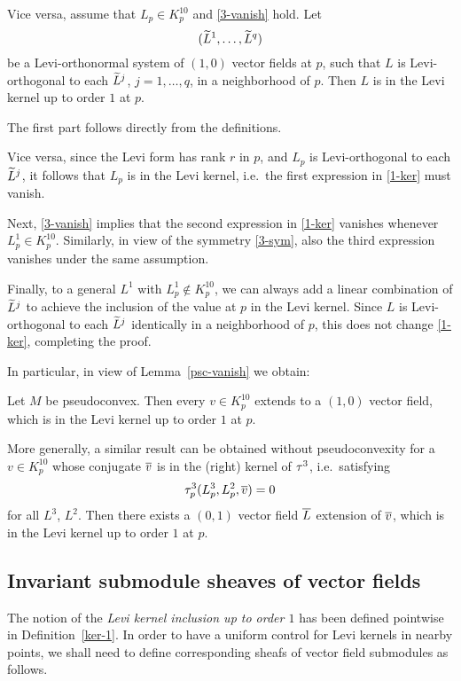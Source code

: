 \documentclass[12pt]{amsart}
\begin{document}
Vice versa, assume that $L_p\in K^{10}_p$ and 
\eqref{3-vanish} hold.
Let
$$(\widetilde{L}^1, \ldots, \widetilde{L}^q)$$
be a Levi-orthonormal system of 
$(1,0)$ vector fields at $p$,
such that $L$ is Levi-orthogonal to each $\widetilde{L}^j$, $j=1,\ldots,q$,
in a neighborhood of $p$.
Then $L$ is in the Levi kernel up to order $1$ at $p$.
\el


\bpf
The first part follows directly from the definitions.

Vice versa, since the Levi form has rank $r$ in $p$,
and $L_p$ is Levi-orthogonal to each $\widetilde{L}^j$,
it follows that $L_p$ is in the Levi kernel, i.e.\
the first expression in \eqref{1-ker} must vanish.

Next, \eqref{3-vanish}
implies that the second expression in \eqref{1-ker}
vanishes whenever $L^1_p\in K^{10}_p$.
Similarly, in view of the symmetry \eqref{3-sym},
also the third expression vanishes
under the same assumption.

Finally, to a general $L^1$ with $L^1_p\notin K^{10}_p$,
we can always add a linear combination of $\widetilde{L}^j$
to achieve the inclusion of the value at $p$ in the Levi kernel.
Since $L$ is Levi-orthogonal to each $\widetilde{L}^j$ identically in a neighborhood of $p$,
this does not change \eqref{1-ker},
completing the proof.
\epf

In particular, in view of Lemma~\ref{psc-vanish} we obtain:

\bc{}
Let $M$ be pseudoconvex.
Then every $v\in K^{10}_p$
extends to a $(1,0)$ vector field,
which is in the Levi kernel up to order $1$ at $p$.
\ec

\br
More generally, a similar result
can be obtained without pseudoconvexity
for a $v\in K^{10}_p$ 
whose conjugate $\overline{v}$ is in the (right) kernel of $\tau^3$, 
i.e.\ satisfying 
$$
	\tau^3_p(L^3_p, L^2_p, \overline{v}) = 0
$$
for all $L^3$, $L^2$.
Then there exists a $(0,1)$ vector field $\overline{L}$ extension of  $\overline{v}$,
which is in the Levi kernel up to order $1$ at $p$.
\er



\subsection{Invariant submodule sheaves of vector fields}
The notion of the {\em Levi kernel inclusion up to order $1$} 
has been defined pointwise in Definition~\ref{ker-1}.
In order to have a uniform control for 
Levi kernels in nearby points,
we shall need to define
corresponding sheafs of vector field submodules as follows. 
\end{document}
